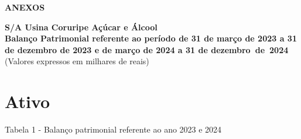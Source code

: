\documentclass[1pt,a4paper]{article}
\begin{document}
	\centering \textbf{ANEXOS}
		
		\begin{center}
			\textbf{\Large S/A Usina Coruripe Açúcar e Álcool}\\
			\textbf{Balanço Patrimonial referente ao período de 31 de março de 2023 a 31 de dezembro de 2023 e de março de 2024 a 31 de dezembro de 2024}\\
			(Valores expressos em milhares de reais)
		\end{center}
		
		
		
		\centering\section*{Ativo}
		Tabela 1 - Balanço patrimonial referente ao ano 2023 e 2024
\end{document}
